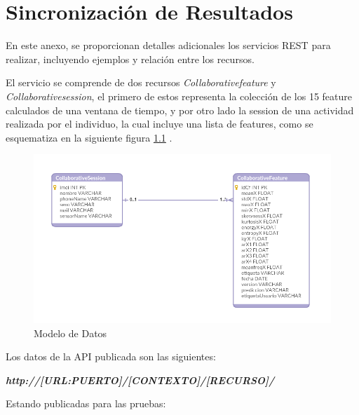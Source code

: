 


\chapter{Sincronización de Resultados}

\label{chapA:rest-api}

En este anexo, se proporcionan detalles adicionales los servicios REST para realizar, incluyendo ejemplos y relación entre los recursos.

El servicio se comprende de dos recursos \textit{Collaborativefeature} y \textit{Collaborativesession}, el primero de estos representa la colección de los 15 feature calculados de una ventana de tiempo, y por otro lado la session de una actividad realizada por el individuo, la cual incluye una lista de features, como se esquematiza en la siguiente figura \ref{fig:der} .

\begin{figure}[!htbp]
	\centering
	\includegraphics[width=0.7\linewidth]{anexos/der}
	\caption[Modelo de Datos]{\label{fig:der}Modelo de Datos}
\end{figure}

Los datos de la API publicada son las siguientes:

\textit{\textbf{http://[URL:PUERTO]/[CONTEXTO]/[RECURSO]/}}

Estando publicadas para las pruebas:

